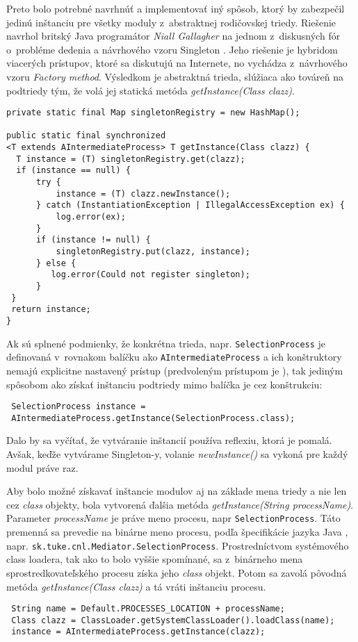 Preto bolo potrebné navrhnúť a implementovať iný spôsob, ktorý by zabezpečil jedinú inštanciu pre všetky 
moduly z~abstraktnej rodičovskej triedy. Riešenie navrhol britský Java programátor \emph{Niall Gallagher}
na jednom z~diskusných fór o~probléme dedenia a návrhového vzoru Singleton \citep{gallagher}.
Jeho riešenie je hybridom viacerých prístupov, ktoré sa diskutujú na Internete, no vychádza
z~návrhového vzoru \emph{Factory method}. Výsledkom je abstraktná trieda, slúžiaca ako továreň na 
podtriedy tým, že volá jej statická metóda \emph{getInstance(Class clazz)}. 
\begin{verbatim}
private static final Map singletonRegistry = new HashMap();

public static final synchronized 
<T extends AIntermediateProcess> T getInstance(Class clazz) {
  T instance = (T) singletonRegistry.get(clazz);
  if (instance == null) {
      try {
          instance = (T) clazz.newInstance();
      } catch (InstantiationException | IllegalAccessException ex) {
          log.error(ex);
      }
      if (instance != null) {
          singletonRegistry.put(clazz, instance);
      } else {
         log.error(Could not register singleton);
      }
 }
 return instance;
}
\end{verbatim}
Ak sú splnené podmienky, že konkrétna trieda, napr. \verb|SelectionProcess| je definovaná v~rovnakom 
balíčku ako \verb|AIntermediateProcess| a ich konštruktory nemajú explicitne nastavený prístup 
(predvoleným prístupom je ), tak 
jediným spôsobom ako získať inštanciu podtriedy mimo balíčka je cez konštrukciu:
\begin{verbatim}
 SelectionProcess instance = 
 AIntermediateProcess.getInstance(SelectionProcess.class);
\end{verbatim}
Dalo by sa vyčítať, že vytváranie inštancií používa reflexiu, ktorá je pomalá. Avšak, keďže vytvárame 
Singleton-y, volanie \emph{newInstance()} sa vykoná pre každý modul práve raz.

Aby bolo možné získavať inštancie modulov aj na základe mena triedy a nie len cez \emph{class} objekty, bola 
vytvorená ďalšia metóda \emph{getInstance(String processName)}. Parameter \emph{processName} je práve meno 
procesu, napr \verb|SelectionProcess|. Táto premenná sa prevedie na binárne meno procesu, 
podľa špecifikácie jazyka Java \citep{java_spec},
napr. \verb|sk.tuke.cnl.Mediator.SelectionProcess|.
Prostredníctvom systémového class loadera, tak ako to bolo vyššie spomínané, sa z~binárneho mena 
sprostredkovateľského procesu získa jeho \emph{class} objekt. Potom sa zavolá pôvodná metóda 
\emph{getInstance(Class clazz)} a tá vráti inštanciu procesu.
\begin{verbatim}
 String name = Default.PROCESSES_LOCATION + processName;
 Class clazz = ClassLoader.getSystemClassLoader().loadClass(name);
 instance = AIntermediateProcess.getInstance(clazz);
\end{verbatim}



